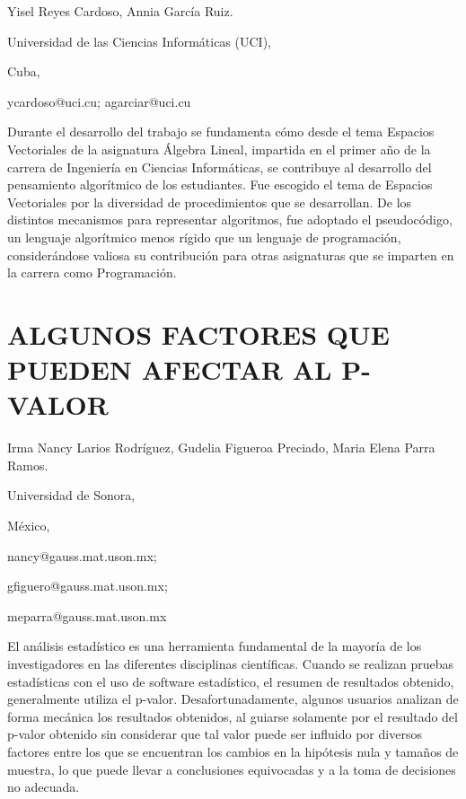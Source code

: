 \begin{datos}

Yisel Reyes Cardoso, Annia García Ruiz.

Universidad de las Ciencias Informáticas (UCI),

Cuba,

ycardoso@uci.cu; agarciar@uci.cu 

\end{datos}

Durante el desarrollo del trabajo se fundamenta cómo desde el tema
Espacios Vectoriales de la asignatura Álgebra Lineal, impartida en
el primer año de la carrera de Ingeniería en Ciencias Informáticas,
se contribuye al desarrollo del pensamiento algorítmico de los estudiantes.
Fue escogido el tema de Espacios Vectoriales por la diversidad de
procedimientos que se desarrollan. De los distintos mecanismos para
representar algoritmos, fue adoptado el pseudocódigo, un lenguaje
algorítmico menos rígido que un lenguaje de programación, considerándose
valiosa su contribución para otras asignaturas que se imparten en
la carrera como Programación. 


\section{ALGUNOS FACTORES QUE PUEDEN AFECTAR AL P-VALOR }

\begin{datos}

Irma Nancy Larios Rodríguez, Gudelia Figueroa Preciado, Maria Elena
Parra Ramos. 

Universidad de Sonora,

México,

nancy@gauss.mat.uson.mx;

gfiguero@gauss.mat.uson.mx;

meparra@gauss.mat.uson.mx

\end{datos}

El análisis estadístico es una herramienta fundamental de la mayoría
de los investigadores en las diferentes disciplinas científicas. Cuando
se realizan pruebas estadísticas con el uso de software estadístico,
el resumen de resultados obtenido, generalmente utiliza el p-valor.
Desafortunadamente, algunos usuarios analizan de forma mecánica los
resultados obtenidos, al guiarse solamente por el resultado del p-valor
obtenido sin considerar que tal valor puede ser influido por diversos
factores entre los que se encuentran los cambios en la hipótesis nula
y tamaños de muestra, lo que puede llevar a conclusiones equivocadas
y a la toma de decisiones no adecuada. 


